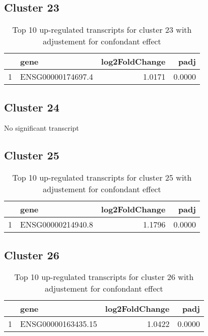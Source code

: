 \documentclass{article}
\begin{document}
\subsection{Cluster 23 }
\begin{table}[H]
\centering
\begin{tabularx}{\textwidth}{rlrr}
  \hline
 & gene & log2FoldChange & padj \\ 
  \hline
1 & ENSG00000174697.4 & 1.0171 & 0.0000 \\ 
   \hline
\end{tabularx}
\caption{Top 10 up-regulated transcripts for cluster 23 with adjustement for confondant effect} 
\label{tab:q3_1_conf_23}
\end{table}
\subsection{Cluster 24 }
No significant transcript
\subsection{Cluster 25 }
\begin{table}[H]
\centering
\begin{tabularx}{\textwidth}{rlrr}
  \hline
 & gene & log2FoldChange & padj \\ 
  \hline
1 & ENSG00000214940.8 & 1.1796 & 0.0000 \\ 
   \hline
\end{tabularx}
\caption{Top 10 up-regulated transcripts for cluster 25 with adjustement for confondant effect} 
\label{tab:q3_1_conf_25}
\end{table}
\subsection{Cluster 26 }
\begin{table}[H]
\centering
\begin{tabularx}{\textwidth}{rlrr}
  \hline
 & gene & log2FoldChange & padj \\ 
  \hline
1 & ENSG00000163435.15 & 1.0422 & 0.0000 \\ 
   \hline
\end{tabularx}
\caption{Top 10 up-regulated transcripts for cluster 26 with adjustement for confondant effect} 
\label{tab:q3_1_conf_26}
\end{table}
\end{document}
